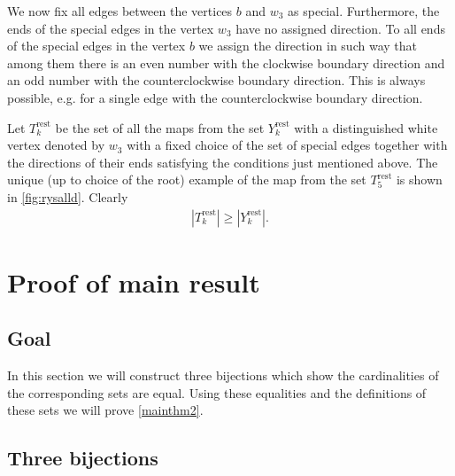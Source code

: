 \documentclass[submission]{FPSAC2021}
\DeclareMathOperator{\rest}{rest}
\begin{document}
\pagebreak[1]

We now fix all edges between 
the vertices $b$ and $w_3$ as special.
Furthermore, the ends of the special edges in the
vertex $w_3$ have no assigned direction. 
To all ends of the special edges in the vertex 
$b$ we assign the direction in such way that among 
them there is an even number with the clockwise boundary direction 
and an odd number with the counterclockwise boundary direction.
This is always possible, e.g. for a single edge 
with the counterclockwise boundary direction.

Let $T_k^{\rest}$ be the set of all the 
maps from the set $Y_k^{\rest}$ with a 
distinguished white vertex denoted by $w_3$ 
with a fixed choice of the set of special 
edges together with the directions of their 
ends satisfying the conditions just mentioned above. 
The unique (up to choice of the root) example 
of the map from the set $T_{5}^{\rest}$ is 
shown in \cref{fig:rysalld}. Clearly
\begin{align}
\label{ineqrest}
|T_{k}^{\rest}| \geq |Y_{k}^{\rest}|.
\end{align}


\section{Proof of main result}

\subsection{Goal}
In this section we will construct three bijections 
which show the cardinalities of the corresponding sets 
are equal. Using these equalities and the definitions 
of these sets we will prove \cref{mainthm2}.

\subsection{Three bijections}
\end{document}
